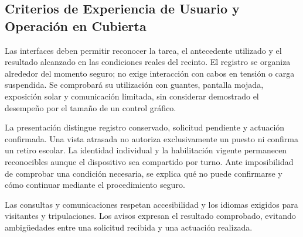 \subsection{Criterios de Experiencia de Usuario y Operación en Cubierta}

Las interfaces deben permitir reconocer la tarea,
el antecedente utilizado y el resultado alcanzado
en las condiciones reales del recinto. El registro
se organiza alrededor del momento seguro; no exige
interacción con cabos en tensión o carga suspendida.
Se comprobará su utilización con guantes,
pantalla mojada, exposición solar y comunicación
limitada, sin considerar demostrado el desempeño
por el tamaño de un control gráfico.

La presentación distingue registro conservado,
solicitud pendiente y actuación confirmada.
Una vista atrasada no autoriza exclusivamente
un puesto ni confirma un retiro escolar.
La identidad individual y la habilitación vigente
permanecen reconocibles aunque el dispositivo
sea compartido por turno. Ante imposibilidad
de comprobar una condición necesaria, se explica
qué no puede confirmarse y cómo continuar mediante
el procedimiento seguro.

Las consultas y comunicaciones respetan accesibilidad
y los idiomas exigidos para visitantes y tripulaciones.
Los avisos expresan el resultado comprobado,
evitando ambigüedades entre una solicitud recibida
y una actuación realizada.
